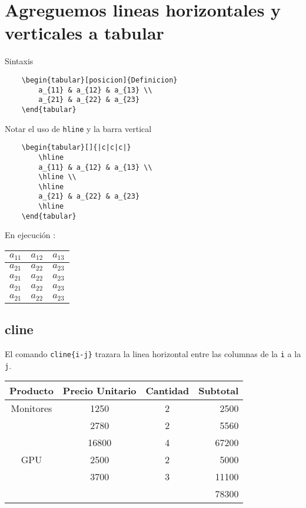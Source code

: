 \documentclass{article}
\begin{document}
\section{Agreguemos lineas horizontales y verticales a tabular}

\noindent Sintaxis

\begin{verbatim}
	\begin{tabular}[posicion]{Definicion}
		a_{11} & a_{12} & a_{13} \\
		a_{21} & a_{22} & a_{23}
	\end{tabular}
\end{verbatim}

Notar el uso de \verb*|hline| y la barra vertical

\begin{verbatim}
	\begin{tabular}[]{|c|c|c|}
		\hline
		a_{11} & a_{12} & a_{13} \\
		\hline \\
		\hline
		a_{21} & a_{22} & a_{23}
		\hline
	\end{tabular}
\end{verbatim}

En ejecución :
\begin{center}
\begin{tabular}[]{|c|c|c|}
	\hline
	$a_{11}$ & $a_{12}$ & $a_{13}$ \\
	\hline 
	$a_{21}$ & $a_{22}$ & $a_{23}$ \\
	\hline
	$a_{21}$ & $a_{22}$ & $a_{23}$ \\
	\hline
	$a_{21}$ & $a_{22}$ & $a_{23}$ \\
	\hline
	$a_{21}$ & $a_{22}$ & $a_{23}$ \\
	\hline
\end{tabular}
\end{center}

\subsection{cline}
El comando \verb*|cline{i-j}| trazara la linea horizontal entre las columnas de la \verb*|i| a la \verb*|j|.
\begin{center}
	\begin{tabular}{cccr}
		\hline
		Producto & Precio Unitario & Cantidad & Subtotal \\
		\hline
		Monitores & 1250 & 2 & 2500\\
				  & 2780 & 2 & 5560\\
				  & 16800 & 4 & 67200\\
		\hline
		GPU		  & 2500 & 2 & 5000\\
				  & 3700 & 3 & 11100\\
				  \cline{4-4}
				  &      &   & 78300
	\end{tabular}
\end{center}
\end{document}
